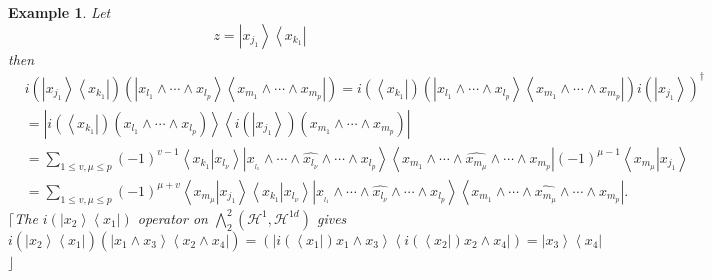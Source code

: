\documentclass[aps,preprint]{revtex4}%
\newtheorem{example}[theorem]{Example}
\begin{document}
\begin{example}
Let
\begin{equation}
z=\left\vert x_{j_{1}}\right\rangle \left\langle x_{k_{1}}\right\vert
\end{equation}
then
\begin{align}
&  i\left(  \left\vert x_{j_{1}}\right\rangle \left\langle x_{k_{1}%
}\right\vert \right)  \left(  \left\vert x_{l_{1}}\wedge\cdots\wedge x_{l_{p}%
}\right\rangle \left\langle x_{m_{1}}\wedge\cdots\wedge x_{m_{p}}\right\vert
\right)  =i\left(  \left\langle x_{k_{1}}\right\vert \right)  \left(
\left\vert x_{l_{1}}\wedge\cdots\wedge x_{l_{p}}\right\rangle \left\langle
x_{m_{1}}\wedge\cdots\wedge x_{m_{p}}\right\vert \right)  i\left(  \left\vert
x_{j_{1}}\right\rangle \right)  ^{\dagger}\\
&  =\left\vert i\left(  \left\langle x_{k_{1}}\right\vert \right)  \left(
x_{l_{1}}\wedge\cdots\wedge x_{l_{p}}\right)  \right\rangle \left\langle
i\left(  \left\vert x_{j_{1}}\right\rangle \right)  \left(  x_{m_{1}}%
\wedge\cdots\wedge x_{m_{p}}\right)  \right\vert \\
&  =\sum_{1\leq v,\mu\leq p}\left(  -1\right)  ^{v-1}\left\langle \left.
x_{k_{1}}\right\vert x_{l_{\nu}}\right\rangle \left\vert x_{_{l_{1}}}%
\wedge\cdots\wedge\widehat{x_{l_{\nu}}}\wedge\cdots\wedge x_{l_{p}%
}\right\rangle \left\langle x_{m_{1}}\wedge\cdots\wedge\widehat{x_{m_{\mu}}%
}\wedge\cdots\wedge x_{m_{p}}\right\vert \left(  -1\right)  ^{\mu
-1}\left\langle \left.  x_{m_{\mu}}\right\vert x_{j_{1}}\right\rangle \\
&  =\sum_{1\leq v,\mu\leq p}\left(  -1\right)  ^{\mu+v}\left\langle \left.
x_{m_{\mu}}\right\vert x_{j_{1}}\right\rangle \left\langle \left.  x_{k_{1}%
}\right\vert x_{l_{\nu}}\right\rangle \left\vert x_{_{l_{1}}}\wedge
\cdots\wedge\widehat{x_{l_{\nu}}}\wedge\cdots\wedge x_{l_{p}}\right\rangle
\left\langle x_{m_{1}}\wedge\cdots\wedge\widehat{x_{m_{\mu}}}\wedge
\cdots\wedge x_{m_{p}}\right\vert .
\end{align}
$\lceil$The $i\left(  \left\vert x_{2}\right\rangle \left\langle
x_{1}\right\vert \right)  $ operator on $%
{\textstyle\bigwedge_{2}^{2}}
\left(  \mathcal{H}^{1},\mathcal{H}^{1d}\right)  $ gives
\begin{equation}
i\left(  \overset{}{\left\vert x_{2}\right\rangle \left\langle x_{1}%
\right\vert }\right)  \left(  \overset{}{\left\vert x_{1}\wedge x_{3}%
\right\rangle \left\langle x_{2}\wedge x_{4}\right\vert }\right)  =\left(
\left\vert i\left(  \left\langle x_{1}\right\vert \right)  x_{1}\wedge
x_{3}\right\rangle \left\langle i\left(  \left\langle x_{2}\right\vert
\right)  x_{2}\wedge x_{4}\right\vert \right)  =\left\vert x_{3}\right\rangle
\left\langle x_{4}\right\vert
\end{equation}
$\rfloor$
\end{example}
\end{document}
